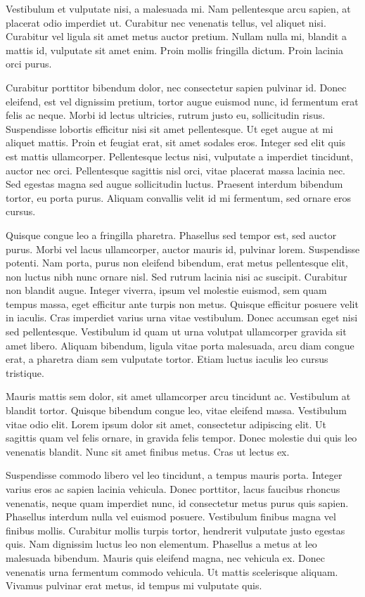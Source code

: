 \documentclass[a4paper]{article}
\begin{document}
Vestibulum et vulputate nisi, a malesuada mi. Nam pellentesque arcu sapien, at placerat odio imperdiet ut. Curabitur nec venenatis tellus, vel aliquet nisi. Curabitur vel ligula sit amet metus auctor pretium. Nullam nulla mi, blandit a mattis id, vulputate sit amet enim. Proin mollis fringilla dictum. Proin lacinia orci purus.

Curabitur porttitor bibendum dolor, nec consectetur sapien pulvinar id. Donec eleifend, est vel dignissim pretium, tortor augue euismod nunc, id fermentum erat felis ac neque. Morbi id lectus ultricies, rutrum justo eu, sollicitudin risus. Suspendisse lobortis efficitur nisi sit amet pellentesque. Ut eget augue at mi aliquet mattis. Proin et feugiat erat, sit amet sodales eros. Integer sed elit quis est mattis ullamcorper. Pellentesque lectus nisi, vulputate a imperdiet tincidunt, auctor nec orci. Pellentesque sagittis nisl orci, vitae placerat massa lacinia nec. Sed egestas magna sed augue sollicitudin luctus. Praesent interdum bibendum tortor, eu porta purus. Aliquam convallis velit id mi fermentum, sed ornare eros cursus.

Quisque congue leo a fringilla pharetra. Phasellus sed tempor est, sed auctor purus. Morbi vel lacus ullamcorper, auctor mauris id, pulvinar lorem. Suspendisse potenti. Nam porta, purus non eleifend bibendum, erat metus pellentesque elit, non luctus nibh nunc ornare nisl. Sed rutrum lacinia nisi ac suscipit. Curabitur non blandit augue. Integer viverra, ipsum vel molestie euismod, sem quam tempus massa, eget efficitur ante turpis non metus. Quisque efficitur posuere velit in iaculis. Cras imperdiet varius urna vitae vestibulum. Donec accumsan eget nisi sed pellentesque. Vestibulum id quam ut urna volutpat ullamcorper gravida sit amet libero. Aliquam bibendum, ligula vitae porta malesuada, arcu diam congue erat, a pharetra diam sem vulputate tortor. Etiam luctus iaculis leo cursus tristique.

Mauris mattis sem dolor, sit amet ullamcorper arcu tincidunt ac. Vestibulum at blandit tortor. Quisque bibendum congue leo, vitae eleifend massa. Vestibulum vitae odio elit. Lorem ipsum dolor sit amet, consectetur adipiscing elit. Ut sagittis quam vel felis ornare, in gravida felis tempor. Donec molestie dui quis leo venenatis blandit. Nunc sit amet finibus metus. Cras ut lectus ex.

Suspendisse commodo libero vel leo tincidunt, a tempus mauris porta. Integer varius eros ac sapien lacinia vehicula. Donec porttitor, lacus faucibus rhoncus venenatis, neque quam imperdiet nunc, id consectetur metus purus quis sapien. Phasellus interdum nulla vel euismod posuere. Vestibulum finibus magna vel finibus mollis. Curabitur mollis turpis tortor, hendrerit vulputate justo egestas quis. Nam dignissim luctus leo non elementum. Phasellus a metus at leo malesuada bibendum. Mauris quis eleifend magna, nec vehicula ex. Donec venenatis urna fermentum commodo vehicula. Ut mattis scelerisque aliquam. Vivamus pulvinar erat metus, id tempus mi vulputate quis.
\end{document}
